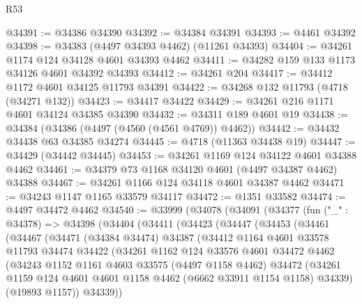 \begin{lexlean}{R53}
\begin{coremodule}
@34391 := @34386 @34390
@34392 := @34384 @34391
@34393 := @4461 @34392
@34398 := @34383 (@4497 @34393 @4462) (@11261 @34393)
@34404 := @34261 @1174 @124 @34128 @4601 @34393 @4462
@34411 := @34282 @159 @133 @1173 @34126 @4601 @34392 @34393
@34412 := @34261 @204
@34417 := @34412 @1172 @4601 @34125 @11793 @34391
@34422 := @34268 @132 @11793 (@4718 (@34271 @132))
@34423 := @34417 @34422
@34429 := @34261 @216 @1171 @4601 @34124 @34385 @34390
@34432 := @34311 @189 @4601 @19
@34438 := @34384 (@34386 (@4497 (@4560 (@4561 @4769)) @4462))
@34442 := @34432 @34438 @63 @34385 @34274
@34445 := @4718 (@11363 @34438 @19)
@34447 := @34429 (@34442 @34445)
@34453 := @34261 @1169 @124 @34122 @4601 @34388 @4462
@34461 := @34379 @73 @1168 @34120 @4601 (@4497 @34387 @4462) @34388
@34467 := @34261 @1166 @124 @34118 @4601 @34387 @4462
@34471 := @34243 @1147 @1165 @33579 @34117
@34472 := @1351 @33582
@34474 := @4497 @34472 @4462
@34540 := @33999
    (@34078
      (@34091
        (@34377
          (fun ("_" : @34378) =>
          @34398
            (@34404
              (@34411
                (@34423
                  (@34447
                    (@34453
                      (@34461
                        (@34467
                          (@34471
                            (@34384 @34474)
                            @34387
                            (@34412
                              @1164
                              @4601
                              @33578
                              @11793
                              @34474
                              @34422
                              (@34261
                                @1162
                                @124
                                @33576
                                @4601
                                @34472
                                @4462
                                (@34243
                                  @1152
                                  @1161
                                  @4603
                                  @33575
                                  (@4497 @1158 @4462)
                                  @34472
                                  (@34261
                                    @1159
                                    @124
                                    @4601
                                    @4601
                                    @1158
                                    @4462
                                    (@6662 @33911 @1154 @1158)
                                    @34339)
                                  (@19893 @1157))
                                @34339))

\end{coremodule}
\end{lexlean}
